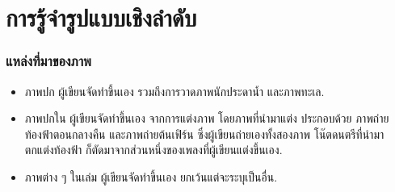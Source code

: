 %











\part{การรู้จำรูปแบบเชิงลำดับ}











\appendix

%


   
  


%
%

\pagebreak


\section*{แหล่งที่มาของภาพ}

\begin{itemize}
	\item ภาพปก ผู้เขียนจัดทำขึ้นเอง รวมถึงการวาดภาพนักประดาน้ำ และภาพทะเล.
	\item ภาพปกใน ผู้เขียนจัดทำขึ้นเอง จากการแต่งภาพ โดยภาพที่นำมาแต่ง ประกอบด้วย ภาพถ่ายท้องฟ้าตอนกลางคืน 
	และภาพถ่ายต้นเฟิร์น ซึ่งผู้เขียนถ่ายเองทั้งสองภาพ
	โน๊ตดนตรีที่นำมาตกแต่งท้องฟ้า ก็ตัดมาจากส่วนหนึ่งของเพลงที่ผู้เขียนแต่งขึ้นเอง.
	
	\item ภาพต่าง ๆ ในเล่ม ผู้เขียนจัดทำขึ้นเอง ยกเว้นแต่จะระบุเป็นอื่น.
\end{itemize}


